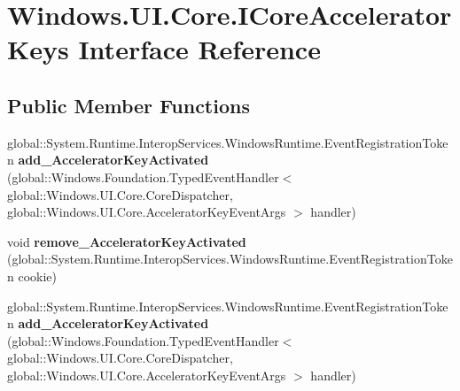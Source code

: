 \hypertarget{interface_windows_1_1_u_i_1_1_core_1_1_i_core_accelerator_keys}{}\section{Windows.\+U\+I.\+Core.\+I\+Core\+Accelerator\+Keys Interface Reference}
\label{interface_windows_1_1_u_i_1_1_core_1_1_i_core_accelerator_keys}
\subsection*{Public Member Functions}
\begin{DoxyCompactItemize}
\item 
\mbox{\label{interface_windows_1_1_u_i_1_1_core_1_1_i_core_accelerator_keys_a8b6129e73c788f400dd51e57d155e12e}} 
global\+::\+System.\+Runtime.\+Interop\+Services.\+Windows\+Runtime.\+Event\+Registration\+Token {\bfseries add\+\_\+\+Accelerator\+Key\+Activated} (global\+::\+Windows.\+Foundation.\+Typed\+Event\+Handler$<$ global\+::\+Windows.\+U\+I.\+Core.\+Core\+Dispatcher, global\+::\+Windows.\+U\+I.\+Core.\+Accelerator\+Key\+Event\+Args $>$ handler)
\item 
\mbox{\label{interface_windows_1_1_u_i_1_1_core_1_1_i_core_accelerator_keys_a821215fbccaab1a96d172dfa425ebdaf}} 
void {\bfseries remove\+\_\+\+Accelerator\+Key\+Activated} (global\+::\+System.\+Runtime.\+Interop\+Services.\+Windows\+Runtime.\+Event\+Registration\+Token cookie)
\item 
\mbox{\label{interface_windows_1_1_u_i_1_1_core_1_1_i_core_accelerator_keys_a8b6129e73c788f400dd51e57d155e12e}} 
global\+::\+System.\+Runtime.\+Interop\+Services.\+Windows\+Runtime.\+Event\+Registration\+Token {\bfseries add\+\_\+\+Accelerator\+Key\+Activated} (global\+::\+Windows.\+Foundation.\+Typed\+Event\+Handler$<$ global\+::\+Windows.\+U\+I.\+Core.\+Core\+Dispatcher, global\+::\+Windows.\+U\+I.\+Core.\+Accelerator\+Key\+Event\+Args $>$ handler)
\item 
\mbox{\label{interface_windows_1_1_u_i_1_1_core_1_1_i_core_accelerator_keys_a821215fbccaab1a96d172dfa425ebdaf}} 

\end{DoxyCompactItemize}
